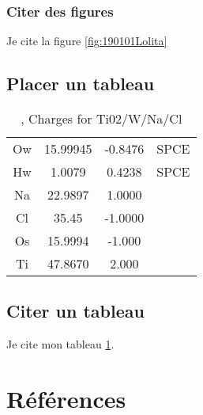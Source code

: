 \documentclass[11pt,a4paper]{article}
\begin{document}
\subsubsection{Citer des figures}
Je cite la figure \ref{fig:190101Lolita}
\subsection{Placer un tableau}
\begin{table}[ht]
\begin{tabular}{cccc}\hline
\hline
Ow& 15.99945& -0.8476&SPCE\\
Hw&  1.0079 &  0.4238&SPCE\\
Na& 22.9897 &  1.0000&\\         
Cl& 35.45   & -1.0000&\\
Os& 15.9994 & -1.000 &\\   
Ti& 47.8670 &  2.000 &\\  
\hline 
\end{tabular}                     
\caption{\label{MonTableau}, Charges for Ti02/W/Na/Cl}
\end{table}
\subsection{Citer un tableau}
Je cite mon tableau \ref{MonTableau}.


\section{Références}
%
\end{document}
